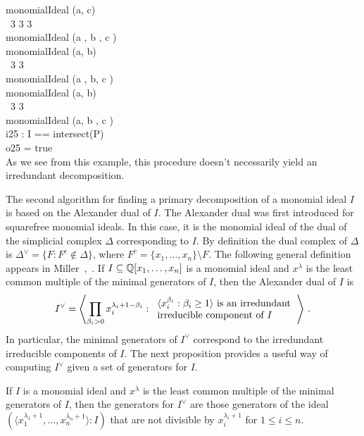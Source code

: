 monomialIdeal (a, c)\\
\emptyLine
\                3   3   3\\
monomialIdeal (a , b , c )\\
\emptyLine
monomialIdeal (a, b)\\
\emptyLine
\                3      3\\
monomialIdeal (a , b, c )\\
\emptyLine
monomialIdeal (a, b)\\
\emptyLine
\                   3   3\\
monomialIdeal (a, b , c )\\
\endOutput
\beginOutput
i25 : I == intersect(P)\\
\emptyLine
o25 = true\\
\endOutput
As we see from this example, this procedure doesn't necessarily
yield an irredundant decomposition.

The second algorithm for finding a primary decomposition of a monomial
ideal $I$ is based on the Alexander dual of $I$.  The Alexander dual was first
introduced for squarefree monomial ideals.  In this case, it is the
monomial ideal of the dual of the simplicial complex $\Delta$
corresponding to $I$.  By definition the dual complex of $\Delta$ is
$\Delta^{\vee} = \{ F : F^{c} \not\in \Delta \}$, where $F^{c} =
\{x_{1}, \dotsc, x_{n}\} \setminus F$.  The following general
definition appears in Miller~\cite{M},~\cite{MR1779598}.  If
$I \subseteq {\mathbb Q}[x_{1},
\dotsc, x_{n}]$ is a monomial ideal and $x^{\lambda}$ is the least
common multiple of the minimal generators of $I$, then the Alexander
dual of $I$ is
\[
I^{\vee} = \left\langle \prod_{\beta_{i} > 0}
x_{i}^{\lambda_{i}+1-\beta_{i}} : \begin{tabular}{l} \text{$\langle
x_{i}^{\beta_{i}} : \beta_{i} \geq 1\rangle$ is an
irredundant} \\ \text{irreducible component of $I$} \end{tabular}
\right\rangle \, .
\]
In particular, the minimal generators of $I^{\vee}$ correspond to the
irredundant irreducible components of $I$.  The next proposition
provides a useful way of computing $I^{\vee}$ given a set of
generators for $I$.

\begin{proposition}  
If $I$ is a monomial ideal and $x^{\lambda}$ is the least common
multiple of the minimal generators of $I$, then the generators for
$I^{\vee}$ are those generators of the ideal $\left( \langle
x_{1}^{\lambda_{1}+1}, \dotsc, x_{n}^{\lambda_{n}+1} \rangle : I
\right)$ that are not divisible by $x_{i}^{\lambda_{i}+1}$ for $1 \leq
i \leq n$.
\end{proposition}

